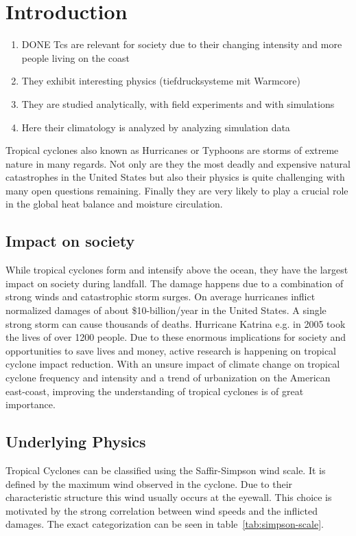 \chapter{Introduction}\label{sec:introduction}
\begin{enumerate}
	\item DONE Tcs are relevant for society due to their changing intensity and more people living on the coast
	\item They exhibit interesting physics (tiefdrucksysteme mit Warmcore)
	\item They are studied analytically, with field experiments and with simulations
	\item Here their climatology is analyzed by analyzing simulation data
\end{enumerate}
Tropical cyclones also known as Hurricanes or Typhoons are storms of extreme nature in many regards. Not only are they the most deadly and expensive natural catastrophes in the United States but also their physics is quite challenging with many open questions remaining.\cite{emanuel-summ}
Finally they are very likely to play a crucial role in the global heat balance and moisture circulation.\cite{moisture-transport}\cite{global-heat}

\section{Impact on society}\label{sec:society}
While tropical cyclones form and intensify above the ocean, they have the largest impact on society during landfall. The damage happens due to a combination of strong winds and catastrophic storm surges. On average hurricanes inflict normalized damages of about \$10-billion/year in the United States.\cite{damage-norm} A single strong storm can cause thousands of deaths. Hurricane Katrina e.g. in 2005 took the lives of over 1200 people.\cite{hurr-2005}
Due to these enormous implications for society and opportunities to save lives and money, active research is happening on tropical cyclone impact reduction. With an unsure impact of climate change on tropical cyclone frequency and intensity and a trend of urbanization on the American east-coast, improving the understanding of tropical cyclones is of great importance.

\section{Underlying Physics}\label{sec:physics}
Tropical Cyclones can be classified using the Saffir-Simpson wind scale. It is defined by the maximum wind observed in the cyclone. Due to their characteristic structure this wind usually occurs at the eyewall. This choice is motivated by the strong correlation between wind speeds and the inflicted damages.\cite{simpson} The exact categorization can be seen in table~\ref{tab:simpson-scale}.

